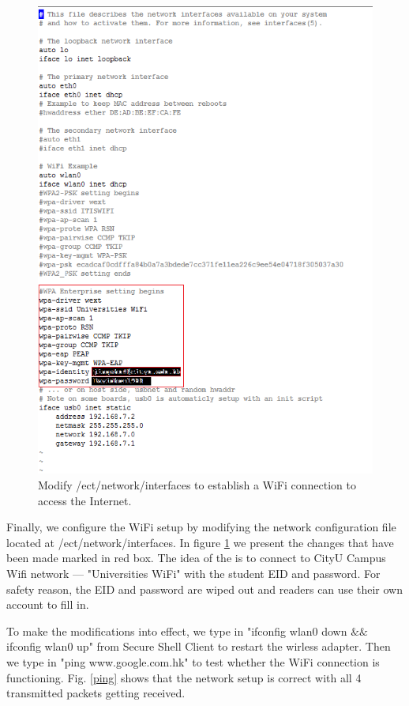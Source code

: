 \documentclass[12pt,journal,draftclsnofoot,onecolumn]{IEEEtran}
\begin{document}
\begin{figure}[htb]
	\centering
	\includegraphics[width=5in]{./figs/wifi.PNG}
	\caption{Modify /ect/network/interfaces to establish a WiFi connection to access the Internet.}
	\label{wifi}
\end{figure}
     
Finally, we configure the WiFi setup by modifying the network configuration file located at /ect/network/interfaces. 
In figure \ref{wifi} we present the changes that have been made marked in red box. The idea of the is to connect to CityU Campus Wifi network --- "Universities WiFi" with the student EID and password. For safety reason, the EID and password are wiped out and readers can use their own account to fill in.



To make the modifications into effect, we type in "ifconfig wlan0 down $\&\&$ ifconfig wlan0 up" from Secure Shell Client to restart the wirless adapter. Then we type in "ping www.google.com.hk" to test whether the WiFi connection is functioning. Fig. \ref{ping} shows that the network setup is correct with all 4 transmitted packets getting received.
\end{document}
